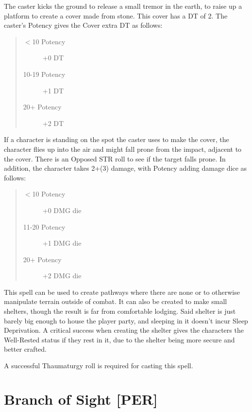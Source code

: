 \documentclass[11pt,a4paper,twocolumn]{book}
\begin{document}
\medskip

The caster kicks the ground to release a small tremor in the earth, to raise up a platform to create a cover made from stone. This cover has a DT of 2. The caster's Potency gives the Cover extra DT as follows:

\newpage

\begin{quote}
	\begin{description}
		\item[$<$10 Potency] 	+0 DT
		\item[10-19 Potency] 	+1 DT
		\item[20+ Potency] 	    +2 DT
	\end{description}	
\end{quote}

If a character is standing on the spot the caster uses to make the cover, the character flies up into the air and might fall prone from the impact, adjacent to the cover. There is an Opposed STR roll to see if the target falls prone. In addition, the character takes 2+(3) damage, with Potency adding damage dice as follows:

\begin{quote}
	\begin{description}
		\item[$<$10 Potency] 	+0 DMG die
		\item[11-20 Potency] 	+1 DMG die
		\item[20+ Potency] 	    +2 DMG die
	\end{description}	
\end{quote}

This spell can be used to create pathways where there are none or to otherwise manipulate terrain outside of combat.
It can also be created to make small shelters, though the result is far from comfortable lodging. Said shelter is just barely big enough to house the player party, and sleeping in it doesn't incur Sleep Deprivation. A critical success when creating the shelter gives the characters the Well-Rested status if they rest in it, due to the shelter being more secure and better crafted.

A successful Thaumaturgy roll is required for casting this spell.

\vfill


\section*{Branch of Sight [PER]}
\end{document}
